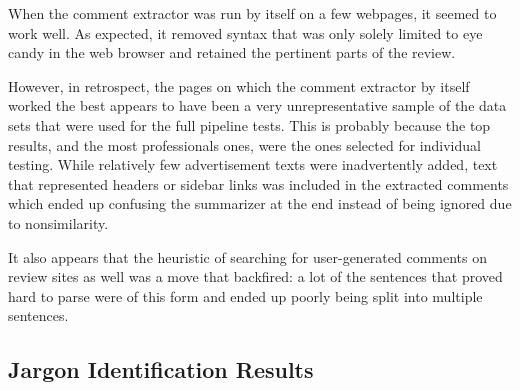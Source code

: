 \documentclass{article}
\begin{document}
When the comment extractor was run by itself on a few webpages, it seemed to
work well. As expected, it removed syntax that was only solely limited to eye
candy in the web browser and retained the pertinent parts of the review.

However, in retrospect, the pages on which the comment extractor by itself
worked the best appears to have been a very unrepresentative sample of the data
sets that were used for the full pipeline tests. This is probably because the
top results, and the most professionals ones, were the ones selected for
individual testing. While relatively few advertisement texts were inadvertently
added, text that represented headers or sidebar links was included in the
extracted comments which ended up confusing the summarizer at the end instead of
being ignored due to nonsimilarity.

It also appears that the heuristic of searching for user-generated comments on
review sites as well was a move that backfired: a lot of the sentences that
proved hard to parse were of this form and ended up poorly being split into
multiple sentences.

\subsection{Jargon Identification Results} %
\end{document}
